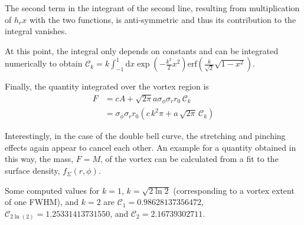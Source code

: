 \documentclass[a4paper]{scrartcl}
\begin{document}
The second term in the integrant of the second line, resulting from multiplication of $h_r x$ with the two functions,
is anti-symmetric and thus its contribution to the integral vanishes.

At this point, the integral only depends on constants and can be integrated numerically to obtain $\mathcal{C}_k = k \int_{-1}^{1} \mathrm{d}x \exp\left( - \frac{k^2}{2} x^2\right)
  \mathrm{erf} \left( \frac{k}{\sqrt{2}} \sqrt{1 - x^2} \right)$.

Finally, the quantity integrated over the vortex region is
\begin{align}
  F & = c A + \sqrt{2\pi} a \sigma_\phi \sigma_r r_0 \, \mathcal{C}_k                \\
    & = \sigma_\phi \sigma_r r_0 \left( c\, k^2 \pi + a \, \sqrt{2\pi} \, \mathcal{C}_k \right)
\end{align}

Interestingly, in the case of the double bell curve, the stretching and pinching effects again appear to cancel each other.
An example for a quantity obtained in this way, the mass, $F=M$, of the vortex can be calculated from a fit to the
surface density, $f_\Sigma(r, \phi)$.

Some computed values for $k=1$, $k=\sqrt{2\ln{2}}$ (corresponding to a vortex extent of one FWHM), and $k=2$ 
are $\mathcal{C}_1 = 0.98628137356472$,
$\mathcal{C}_{2\ln(2)} = 1.25331413731550$, and $\mathcal{C}_2 = 2.16739302711$.
\end{document}

